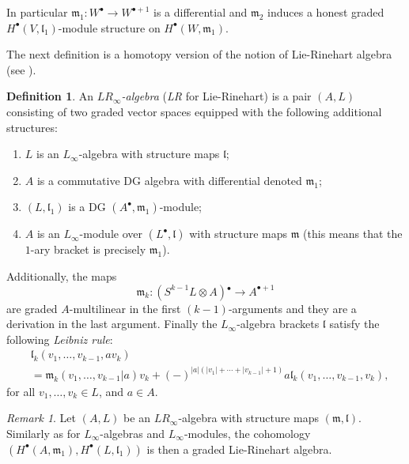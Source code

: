 \documentclass{conm-p-l}
\theoremstyle{definition}
\newtheorem{definition}[theorem]{Definition}
\theoremstyle{remark}
\newtheorem{remark}[theorem]{Remark}
\numberwithin{equation}{section}
\begin{document}
In particular $\mathfrak m_1 : W^\bullet \to W^{\bullet +1}$ is a differential and $\mathfrak m_2$ induces a honest graded $H^\bullet (V, \mathfrak l_1)$-module structure on $H^\bullet (W, \mathfrak m_1)$.

The next definition is a homotopy version of the notion of Lie-Rinehart algebra (see \cite{k01, k01b, h05, h13, vi12, v15}).

\begin{definition}
An \emph{$LR_\infty$-algebra} \cite{vi12} (\emph{LR} for Lie-Rinehart) is a pair $(A, L)$ consisting of two graded vector spaces equipped with the following additional structures:
\begin{enumerate}
\item $L$ is an $L_\infty$-algebra with structure maps $\mathfrak l$;
\item $A$ is a commutative DG algebra with differential denoted $\mathfrak m_1$;
\item $(L, \mathfrak l_1)$ is a DG $(A^\bullet, \mathfrak m_1)$-module;
\item $A$ is an $L_\infty$-module over $(L^\bullet, \mathfrak l)$ with structure maps $\mathfrak m$ (this means that the $1$-ary bracket is precisely $\mathfrak m_1$).
\end{enumerate} 
Additionally, the maps
\[
\mathfrak m_k : \left(S^{k-1} L \otimes A \right){}^\bullet \to A^{\bullet + 1}
\]
are graded $A$-multilinear in the first $(k-1)$-arguments and they are a derivation in the last argument. Finally the $L_\infty$-algebra brackets $\mathfrak l$ satisfy the following \emph{Leibniz rule}:
\[
\begin{aligned}
&\mathfrak l_k (v_1, \ldots, v_{k-1}, a v_k) \\
& = \mathfrak m_{k} (v_1, \ldots, v_{k-1}|a) v_k + (-)^{|a| \left(|v_1| + \cdots + |v_{k-1}| + 1 \right)}a \mathfrak l_k (v_1, \ldots, v_{k-1}, v_k),
\end{aligned}
\]
for all $v_1, \ldots, v_k \in L$, and $a \in A$.
\end{definition}

\begin{remark}\label{rem:LR_cohom}
Let $(A, L)$ be an $LR_\infty$-algebra with structure maps $(\mathfrak m, \mathfrak l)$. Similarly as for $L_\infty$-algebras and $L_\infty$-modules, the cohomology $(H^\bullet (A, \mathfrak m_1), H^\bullet (L, \mathfrak l_1))$ is then a graded Lie-Rinehart algebra.
\end{remark}
\end{document}
